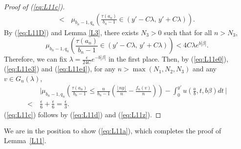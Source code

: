 \begin{proof}[Proof of (\ref{eq:L11c})]
\begin{align}
  <\, &\textstyle\mu_{b_n -1, q_n} \left( \frac{\tau(a_n)}{b_n -1} \in \left(y' - C\lambda,\, y' + C\lambda \right) \right). \nonumber
\end{align}
By (\ref{eq:L11D}) and Lemma \ref{L3}, there exists $N_3 > 0$ such that for all $n > N_3$,
\begin{equation}
\mu_{b_n -1, q_n} \left( \frac{\tau(a_n)}{b_n -1} \in \left(y' - C\lambda,\, y' + C\lambda \right) \right)
 < 4C\lambda e^{b |\beta|}. \label{eq:L11e4}
\end{equation}
Therefore, we can fix $\lambda = \frac{\epsilon}{24C} e^{- b |\beta|}$ in the first place.
Then, by (\ref{eq:L11e0}), (\ref{eq:L11e3}) and (\ref{eq:L11e4}), for any $n > \max{(N_1, N_2, N_3)}$ and any $v \in G_n(\lambda)$,
\begin{align}
  &\textstyle\Big|\mu_{b_n -1, q_n} \left( \frac{\tau(a_n)}{b_n -1} \le
  \frac{n}{b_n -1} \left( \frac{\lfloor n y \rfloor}{n} - \frac{f_n(v)}{n} \right) \right) -
    \int_{0}^{y'} u\left(\frac{a}{b}, t, b \beta\right)dt \,\Big| \label{eq:L11z} \\
   <\ & \frac{\epsilon}{6} + \frac{\epsilon}{6} = \frac{\epsilon}{3}. \nonumber
\end{align}
(\ref{eq:L11c}) follows by (\ref{eq:L11d}) and (\ref{eq:L11z}).
\end{proof}
We are in the position to show (\ref{eq:L11a}), which completes the proof of Lemma~\ref{L11}.
